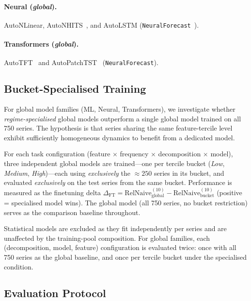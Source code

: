 \documentclass[pdflatex,sn-mathphys-num]{sn-jnl}
\theoremstyle{thmstyleone}
\theoremstyle{thmstyletwo}
\theoremstyle{thmstylethree}
\begin{document}
\paragraph{Neural (\textit{global}).}
AutoNLinear, AutoNHITS~\cite{challu2023nhits}, and AutoLSTM
(\texttt{NeuralForecast}~\cite{olivares2023neuralforecast}).

\paragraph{Transformers (\textit{global}).}
AutoTFT~\cite{lim2021tft} and AutoPatchTST~\cite{nie2022patchtst}
(\texttt{NeuralForecast}).

\subsection{Bucket-Specialised Training}\label{sec:finetuning}

For global model families (ML, Neural, Transformers), we investigate whether
\emph{regime-specialised} global models outperform a single global model trained
on all 750 series.
The hypothesis is that series sharing the same feature-tercile level exhibit
sufficiently homogeneous dynamics to benefit from a dedicated model.

For each task configuration (feature $\times$ frequency $\times$ decomposition
$\times$ model), three independent global models are trained---one per tercile
bucket (\textit{Low}, \textit{Medium}, \textit{High})---each using
\emph{exclusively} the $\approx\!250$ series in its bucket, and evaluated
\emph{exclusively} on the test series from the same bucket.
Performance is measured as the finetuning delta
$\Delta_{\mathrm{FT}} = \mathrm{RelNaive}^{(10)}_{\mathrm{global}} -
\mathrm{RelNaive}^{(10)}_{\mathrm{bucket}}$ (positive = specialised model wins).
The global model (all 750 series, no bucket restriction) serves as the
comparison baseline throughout.

Statistical models are excluded as they fit independently per series and are
unaffected by the training-pool composition.
For global families, each (decomposition, model, feature) configuration is
evaluated twice: once with all 750 series as the global baseline, and once per
tercile bucket under the specialised condition.

\subsection{Evaluation Protocol}\label{sec:evaluation}
\end{document}
